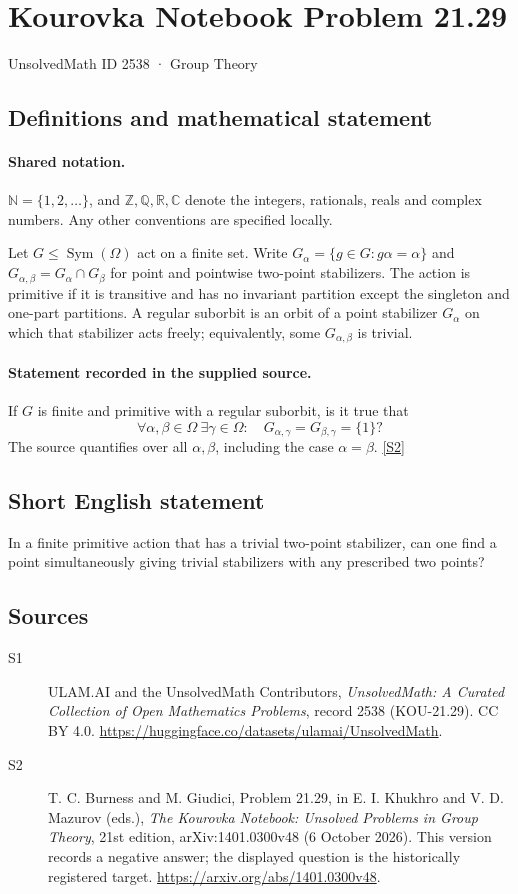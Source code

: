 \documentclass[11pt]{article}
\newcommand{\sref}[2]{\hyperlink{source:#1:#2}{[S#2]}}
\begin{document}
\setcounter{section}{2537}
\section{Kourovka Notebook Problem 21.29}\label{2538}
{\small\sffamily UnsolvedMath ID 2538 · Group Theory}
\subsection{Definitions and mathematical statement}

\paragraph{Shared notation.}$\mathbb N=\{1,2,\ldots\}$, and $\mathbb Z,\mathbb Q,\mathbb R,\mathbb C$ denote the integers, rationals, reals and complex numbers. Any other conventions are specified locally.


Let $G\leq\operatorname{Sym}(\Omega)$ act on a finite set. Write $G_\alpha=\{g\in G:g\alpha=\alpha\}$ and $G_{\alpha,\beta}=G_\alpha\cap G_\beta$ for point and pointwise two-point stabilizers. The action is primitive if it is transitive and has no invariant partition except the singleton and one-part partitions. A regular suborbit is an orbit of a point stabilizer $G_\alpha$ on which that stabilizer acts freely; equivalently, some $G_{\alpha,\beta}$ is trivial.
\paragraph{Statement recorded in the supplied source.}
If $G$ is finite and primitive with a regular suborbit, is it true that
\[
 \forall\alpha,\beta\in\Omega\ \exists\gamma\in\Omega:\quad
 G_{\alpha,\gamma}=G_{\beta,\gamma}=\{1\}?
\]
The source quantifies over all $\alpha,\beta$, including the case $\alpha=\beta$. \sref{2538}{2}
\subsection{Short English statement}
In a finite primitive action that has a trivial two-point stabilizer, can one find a point simultaneously giving trivial stabilizers with any prescribed two points?
\subsection{Sources}
\begin{description}
\item[\hypertarget{source:2538:1}{S1}] ULAM.AI and the UnsolvedMath Contributors, \emph{UnsolvedMath: A Curated Collection of Open Mathematics Problems}, record 2538 (KOU-21.29). CC BY 4.0. \url{https://huggingface.co/datasets/ulamai/UnsolvedMath}.
\item[\hypertarget{source:2538:2}{S2}] T. C. Burness and M. Giudici, Problem 21.29, in E. I. Khukhro and V. D. Mazurov (eds.), \emph{The Kourovka Notebook: Unsolved Problems in Group Theory}, 21st edition, arXiv:1401.0300v48 (6 October 2026). This version records a negative answer; the displayed question is the historically registered target. \url{https://arxiv.org/abs/1401.0300v48}.
\end{description}
\label{end:2538}
\end{document}

